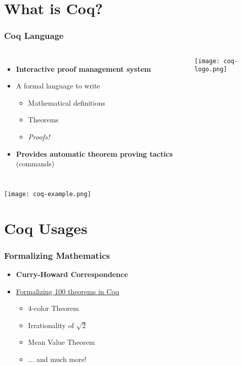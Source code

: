 \section{What is Coq?}

\begin{frame}
    \frametitle{Coq Language}

    \begin{columns}
        \begin{itemize}
            \item \textbf{Interactive proof management system}
            \item A formal language to write
                  \begin{itemize}
                      \item Mathematical definitions
                      \item Theorems
                      \item \textit{Proofs!}
                  \end{itemize}
            \item \textbf{Provides automatic theorem proving tactics} (commands)
        \end{itemize}

        \begin{center}
            \texttt{[image: coq-logo.png]}
        \end{center}
    \end{columns}
\end{frame}

\begin{frame}
    \begin{center}
        \texttt{[image: coq-example.png]}
    \end{center}
\end{frame}

\section{Coq Usages}

\begin{frame}
    \frametitle{Formalizing Mathematics}

    \begin{itemize}
        \item \textbf{Curry-Howard Correspondence}
        \item \href{https://madiot.fr/coq100/}{\underline{Formalizing 100 theorems in Coq}}
        \begin{itemize}
            \item 4-color Theorem
            \item Irrationality of \(\sqrt{2}\)
            \item Mean Value Theorem
            \item ... and much more!
        \end{itemize}
    \end{itemize}
\end{frame}

